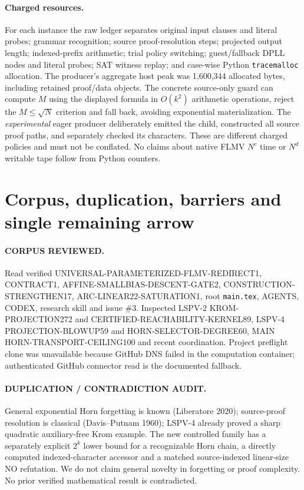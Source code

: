 \documentclass[11pt]{article}
\begin{document}
\paragraph{Charged resources.} For each instance the raw ledger separates original input clauses and literal probes; grammar recognition; source proof-resolution steps; projected output length; indexed-prefix arithmetic; trial policy switching; guest/fallback DPLL nodes and literal probes; SAT witness replay; and case-wise Python \texttt{tracemalloc} allocation. The producer's aggregate host peak was 1,600,344 allocated bytes, including retained proof/data objects. The concrete source-only guard can compute $M$ using the displayed formula in $O(k^2)$ arithmetic operations, reject the $M\le\sqrt N$ criterion and fall back, avoiding exponential materialization. The \emph{experimental} eager producer deliberately emitted the child, constructed all source proof paths, and separately checked its characters. These are different charged policies and must not be conflated. No claims about native FLMV $N^c$ time or $N^d$ writable tape follow from Python counters.

\section{Corpus, duplication, barriers and single remaining arrow}
\paragraph{CORPUS REVIEWED.} Read verified UNIVERSAL-PARAMETERIZED-FLMV-REDIRECT1, CONTRACT1, AFFINE-SMALLBIAS-DESCENT-GATE2, CONSTRUCTION-STRENGTHEN17, ARC-LINEAR22-SATURATION1, root \texttt{main.tex}, AGENTS, CODEX, research skill and issue \#3. Inspected LSPV-2 KROM-PROJECTION272 and CERTIFIED-REACHABILITY-KERNEL89, LSPV-4 PROJECTION-BLOWUP59 and HORN-SELECTOR-DEGREE60, MAIN HORN-TRANSPORT-CEILING100 and recent coordination. Project preflight clone was unavailable because GitHub DNS failed in the computation container; authenticated GitHub connector read is the documented fallback.
\paragraph{DUPLICATION / CONTRADICTION AUDIT.} General exponential Horn forgetting is known (Liberatore 2020); source-proof resolution is classical (Davis--Putnam 1960); LSPV-4 already proved a sharp quadratic auxiliary-free Krom example. The new controlled family has a separately explicit $2^k$ lower bound for a recognizable Horn chain, a directly computed indexed-character accessor and a matched source-indexed linear-size NO refutation. We do not claim general novelty in forgetting or proof complexity. No prior verified mathematical result is contradicted.
\end{document}
